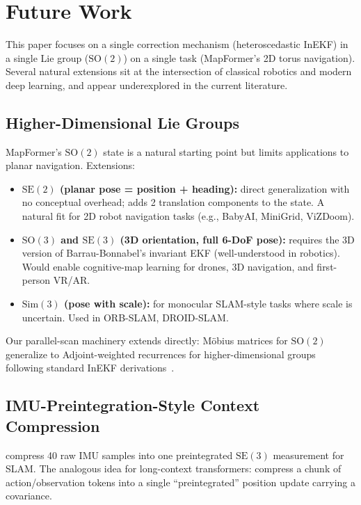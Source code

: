 \section{Future Work}
\label{sec:future}

This paper focuses on a single correction mechanism (heteroscedastic
InEKF) in a single Lie group ($\mathrm{SO}(2)$) on a single task
(MapFormer's 2D torus navigation). Several natural extensions sit at
the intersection of classical robotics and modern deep learning, and
appear underexplored in the current literature.

\subsection{Higher-Dimensional Lie Groups}

MapFormer's $\mathrm{SO}(2)$ state is a natural starting point but
limits applications to planar navigation. Extensions:
\begin{itemize}
  \item \textbf{$\mathrm{SE}(2)$ (planar pose = position + heading):}
  direct generalization with no conceptual overhead; adds 2 translation
  components to the state. A natural fit for 2D robot navigation tasks
  (e.g., BabyAI, MiniGrid, ViZDoom).
  \item \textbf{$\mathrm{SO}(3)$ and $\mathrm{SE}(3)$ (3D orientation,
  full 6-DoF pose):} requires the 3D version of Barrau-Bonnabel's
  invariant EKF (well-understood in robotics). Would enable
  cognitive-map learning for drones, 3D navigation, and first-person
  VR/AR.
  \item \textbf{$\mathrm{Sim}(3)$ (pose with scale):} for monocular
  SLAM-style tasks where scale is uncertain. Used in ORB-SLAM,
  DROID-SLAM.
\end{itemize}
Our parallel-scan machinery extends directly: M\"obius matrices for
$\mathrm{SO}(2)$ generalize to Adjoint-weighted recurrences for
higher-dimensional groups following standard InEKF
derivations~\citep{sola2018micro}.

\subsection{IMU-Preintegration-Style Context Compression}

\citet{forster2017preintegration} compress 40 raw IMU samples into one
preintegrated $\mathrm{SE}(3)$ measurement for SLAM. The analogous
idea for long-context transformers: compress a chunk of
action/observation tokens into a single ``preintegrated'' position
update carrying a covariance.


